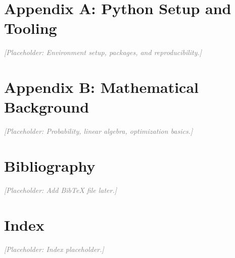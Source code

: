 \documentclass[11pt,oneside]{book}
\newcommand{\placeholder}[1]{%
  \par\noindent\textcolor{gray}{\textit{[Placeholder: #1]}}\par
}
\begin{document}




























\backmatter
\chapter*{Appendix A: Python Setup and Tooling}
\placeholder{Environment setup, packages, and reproducibility.}

\chapter*{Appendix B: Mathematical Background}
\placeholder{Probability, linear algebra, optimization basics.}

\chapter*{Bibliography}
\placeholder{Add Bib\TeX{} file later.}

\chapter*{Index}
\placeholder{Index placeholder.}
\end{document}
